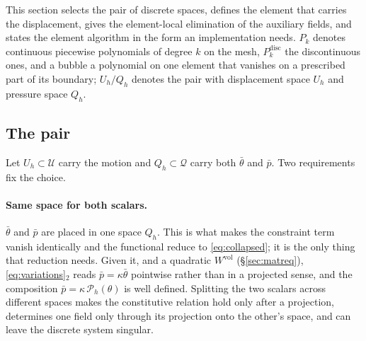 \documentclass[11pt]{article}
\newcommand{\supvol}{^{\mathrm{vol}}}
\theoremstyle{definition}
\theoremstyle{plain}
\begin{document}
This section selects the pair of discrete spaces, defines the element that
carries the displacement, gives the element-local elimination of the
auxiliary fields, and states the element algorithm in the form an
implementation needs. $P_k$ denotes continuous piecewise
polynomials of degree $k$ on the mesh, $P_k^{\mathrm{disc}}$ the discontinuous
ones, and a bubble a polynomial on one element that vanishes on a prescribed
part of its boundary; $U_h/Q_h$ denotes the pair with displacement space
$U_h$ and pressure space $Q_h$.

\subsection{The pair}
\label{sec:fe-spaces}

Let $U_h \subset \mathcal{U}$ carry the motion and $Q_h \subset \mathcal{Q}$
carry both $\bar\theta$ and $\bar p$. Two requirements fix the choice.

\paragraph{Same space for both scalars.} $\bar\theta$ and $\bar p$ are placed in one
space $Q_h$. This is what makes the constraint term vanish identically and the
functional reduce to \eqref{eq:collapsed}; it is the only thing that reduction
needs. Given it, and a quadratic $W\supvol$ (\S\ref{sec:matreq}),
\eqref{eq:variations}$_2$ reads $\bar p = \kappa\bar\theta$ pointwise rather
than in a projected sense, and the composition
$\bar p = \kappa\,\mathcal{P}_h(\theta)$ is well defined. Splitting the two scalars
across different spaces makes the constitutive relation hold only after a
projection, determines one field only through its projection onto the other's
space, and can leave the discrete system singular.
\end{document}
